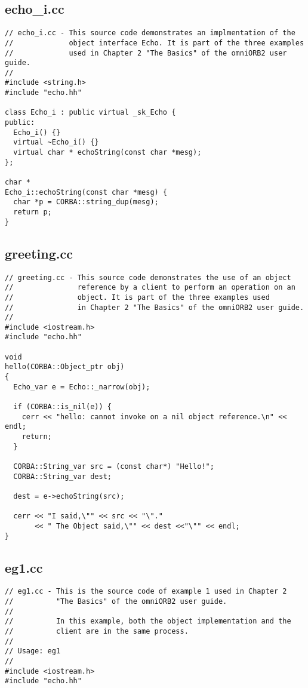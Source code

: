 \documentclass[11pt,twoside,onecolumn]{book}
\begin{document}
{\small
\subsection{echo\_i.cc}
\begin{verbatim}
// echo_i.cc - This source code demonstrates an implmentation of the
//             object interface Echo. It is part of the three examples
//             used in Chapter 2 "The Basics" of the omniORB2 user guide.
//
#include <string.h>
#include "echo.hh"

class Echo_i : public virtual _sk_Echo {
public:
  Echo_i() {}
  virtual ~Echo_i() {}
  virtual char * echoString(const char *mesg);
};

char *
Echo_i::echoString(const char *mesg) {
  char *p = CORBA::string_dup(mesg);
  return p;
}
\end{verbatim}
\newpage

\subsection{greeting.cc}
\begin{verbatim}
// greeting.cc - This source code demonstrates the use of an object
//               reference by a client to perform an operation on an 
//               object. It is part of the three examples used
//               in Chapter 2 "The Basics" of the omniORB2 user guide.
//
#include <iostream.h>
#include "echo.hh"

void
hello(CORBA::Object_ptr obj)
{
  Echo_var e = Echo::_narrow(obj);

  if (CORBA::is_nil(e)) {
    cerr << "hello: cannot invoke on a nil object reference.\n" << endl;
    return;
  }

  CORBA::String_var src = (const char*) "Hello!";  
  CORBA::String_var dest;

  dest = e->echoString(src);

  cerr << "I said,\"" << src << "\"."
       << " The Object said,\"" << dest <<"\"" << endl;
}
\end{verbatim}
\newpage

\subsection{eg1.cc}
\begin{verbatim}
// eg1.cc - This is the source code of example 1 used in Chapter 2 
//          "The Basics" of the omniORB2 user guide.
//
//          In this example, both the object implementation and the 
//          client are in the same process.
//
// Usage: eg1
//
#include <iostream.h>
#include "echo.hh"


\end{verbatim}}
\end{document}
